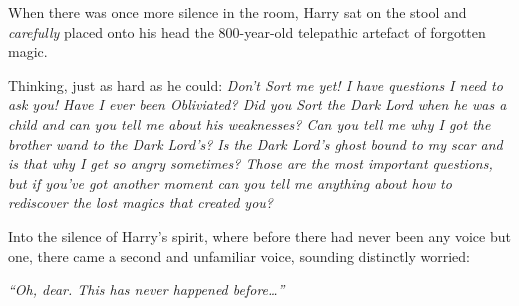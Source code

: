 When there was once more silence in the room, Harry sat on the stool and
\emph{carefully} placed onto his head the 800-year-old telepathic
artefact of forgotten magic.

Thinking, just as hard as he could: \emph{Don't Sort me yet! I have
questions I need to ask you! Have I ever been Obliviated? Did you Sort
the Dark Lord when he was a child and can you tell me about his
weaknesses? Can you tell me why I got the brother wand to the Dark
Lord's? Is the Dark Lord's ghost bound to my scar and is that why I get
so angry sometimes? Those are the most important questions, but if
you've got another moment can you tell me anything about how to
rediscover the lost magics that created you?}

Into the silence of Harry's spirit, where before there had never been
any voice but one, there came a second and unfamiliar voice, sounding
distinctly worried:

\emph{``Oh, dear. This has never happened before\ldots{}''}
